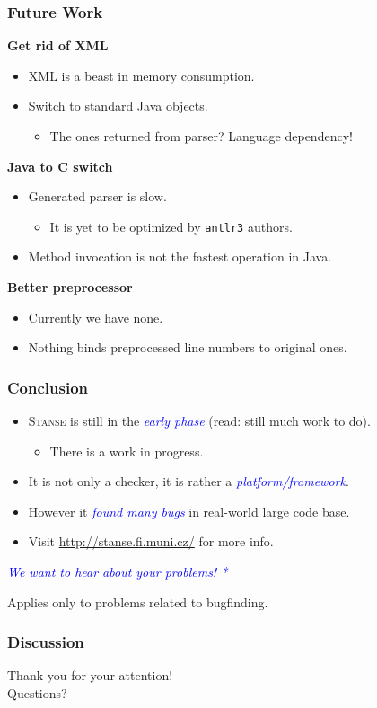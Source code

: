 \documentclass[xcolor=dvipsnames]{beamer}
\let\Oldemph\emph
\renewcommand{\emph}[1]{\textcolor{blue}{\Oldemph{#1}}}
\newcommand{\heading}[1]{\textbf{\textcolor{BurntOrange}{#1}}}
\begin{document}
\begin{frame}
  \frametitle{Future Work}
  \heading{Get rid of XML}
  \begin{itemize}
  \item XML is a beast in memory consumption.
  \item Switch to standard Java objects.
    \begin{itemize}
    \item The ones returned from parser? Language dependency!
    \end{itemize}
  \end{itemize}

  \pause
  \medskip

  \heading{Java to C switch}
  \begin{itemize}
  \item Generated parser is slow.
    \begin{itemize}
    \item It is yet to be optimized by \texttt{antlr3} authors.
    \end{itemize}
  \item Method invocation is not the fastest operation in Java.
  \end{itemize}

  \pause
  \medskip

  \heading{Better preprocessor}
  \begin{itemize}
  \item Currently we have none.
  \item Nothing binds preprocessed line numbers to original ones.
  \end{itemize}

\end{frame}

\begin{frame}
  \frametitle{Conclusion}
  \begin{itemize}
  \item \textsc{Stanse} is still in the \emph{early phase} (read: still much
    work to do).
    \begin{itemize}
    \item There is a work in progress.
    \end{itemize}
  \item It is not only a checker, it is rather a \emph{platform/framework}.
  \item However it \emph{found many bugs} in real-world large code base.
  \item Visit \url{http://stanse.fi.muni.cz/} for more info.
  \end{itemize}

  \pause
  \vfill
  \begin{center}
    \emph{We want to hear about your problems! *}
  \end{center}

  \vfill
  {\tiny * Applies only to problems related to bugfinding.}
\end{frame}

\begin{frame}
  \frametitle{Discussion}
  \begin{center} \huge
  Thank you for your attention! \\[2.4em]
  Questions?
  \end{center}
\end{frame}
\end{document}
